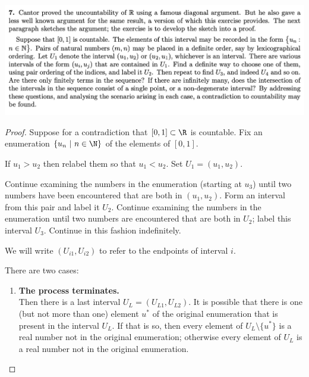 \newpage
\begin{mdframed}
  \includegraphics[width=400pt]{img/analysis--berkeley-202a--homework-1-a577.png}
\end{mdframed}

\begin{proof}
  Suppose for a contradiction that $[0, 1] \subset \R$ is countable. Fix an enumeration $\{u_n ~|~ n \in \N\}$
  of the elements of $[0, 1]$.

  If $u_1 > u_2$ then relabel them so that $u_1 < u_2$. Set $U_1 = (u_1, u_2)$.

  Continue examining the numbers in the enumeration (starting at $u_3$) until two numbers have been encountered
  that are both in $(u_1, u_2)$. Form an interval from this pair and label it $U_2$. Continue examining the
  numbers in the enumeration until two numbers are encountered that are both in $U_2$; label this
  interval $U_3$. Continue in this fashion indefinitely.

  We will write $(U_{i1}, U_{i2})$ to refer to the endpoints of interval $i$.

  There are two cases:

  \begin{enumerate}
  \item {\bf The process terminates.}\\
    Then there is a last interval $U_L = (U_{L1}, U_{L2})$. It is possible that there is one (but not more than
    one) element $u^*$ of the original enumeration that is present in the interval $U_L$. If that is so, then
    every element of $U_L \setminus \{u^*\}$ is a real number not in the original enumeration; otherwise every
    element of $U_L$ is a real number not in the original enumeration.


\end{enumerate}
\end{proof}
